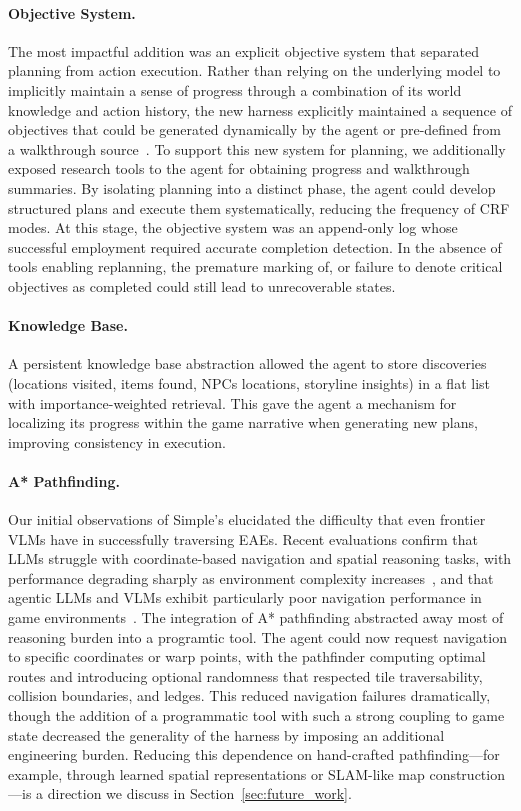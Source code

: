 \paragraph{Objective System.} The most impactful addition was an explicit objective system that separated planning from action execution. Rather than relying on the underlying model to implicitly maintain a sense of progress through a combination of its world knowledge and action history, the new harness explicitly maintained a sequence of objectives that could be generated dynamically by the agent or pre-defined from a walkthrough source~\citep{bulbapedia2025walkthrough}. To support this new system for planning, we additionally exposed research tools to the agent for obtaining progress and walkthrough summaries. By isolating planning into a distinct phase, the agent could develop structured plans and execute them systematically, reducing the frequency of CRF modes. At this stage, the objective system was an append-only log whose successful employment required accurate completion detection. In the absence of tools enabling replanning, the premature marking of, or failure to denote critical objectives as completed could still lead to unrecoverable states.

\paragraph{Knowledge Base.} A persistent knowledge base abstraction allowed the agent to store discoveries (locations visited, items found, NPCs locations, storyline insights) in a flat list with importance-weighted retrieval. This gave the agent a mechanism for localizing its progress within the game narrative when generating new plans, improving consistency in execution.

\paragraph{A* Pathfinding.} Our initial observations of \pokeagent{} Simple's elucidated the difficulty that even frontier VLMs have in successfully traversing EAEs. Recent evaluations confirm that LLMs struggle with coordinate-based navigation and spatial reasoning tasks, with performance degrading sharply as environment complexity increases~\citep{yamada2024evaluating}, and that agentic LLMs and VLMs exhibit particularly poor navigation performance in game environments~\citep{paglieri2024balrog}.  The integration of A* pathfinding abstracted away most of reasoning burden into a programtic tool. The agent could now request navigation to specific coordinates or warp points, with the pathfinder computing optimal routes and introducing optional randomness that respected tile traversability, collision boundaries, and ledges. This reduced navigation failures dramatically, though the addition of a programmatic tool with such a strong coupling to game state decreased the generality of the harness by imposing an additional engineering burden. Reducing this dependence on hand-crafted pathfinding---for example, through learned spatial representations or SLAM-like map construction---is a direction we discuss in Section~\ref{sec:future_work}.


